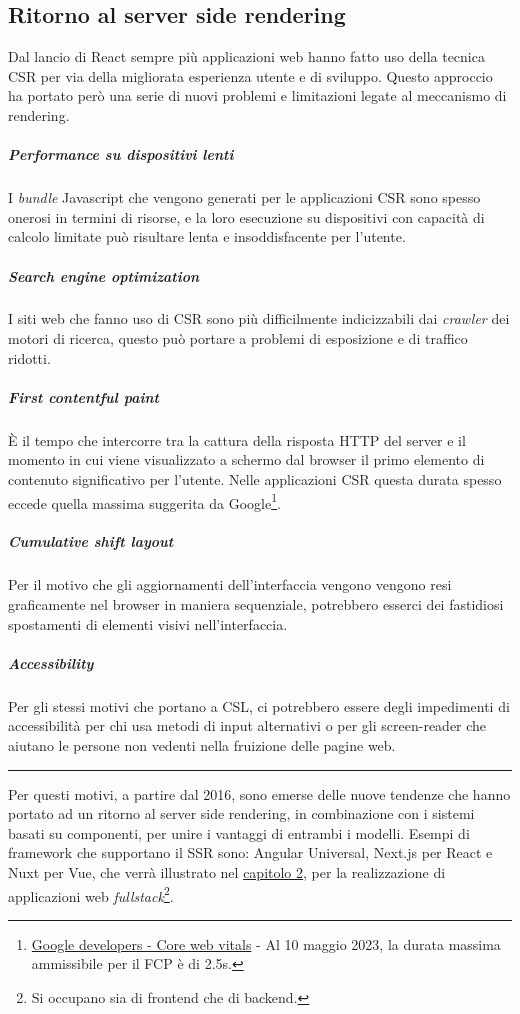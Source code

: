 \subsection{Ritorno al server side
rendering}\label{ritorno-al-server-side-rendering}

Dal lancio di React sempre più applicazioni web hanno fatto uso della
tecnica CSR per via della migliorata esperienza utente e di sviluppo.
Questo approccio ha portato però una serie di nuovi problemi e
limitazioni legate al meccanismo di rendering.

\subparagraph{Performance su dispositivi
lenti}\label{performance-su-dispositivi-lenti}

I \emph{bundle} Javascript che vengono generati per le applicazioni CSR
sono spesso onerosi in termini di risorse, e la loro esecuzione su
dispositivi con capacità di calcolo limitate può risultare lenta e
insoddisfacente per l'utente.

\subparagraph{Search engine
optimization}\label{search-engine-optimization}

I siti web che fanno uso di CSR sono più difficilmente indicizzabili dai
\emph{crawler} dei motori di ricerca, questo può portare a problemi di
esposizione e di traffico ridotti.

\subparagraph{First contentful paint}\label{first-contentful-paint}

È il tempo che intercorre tra la cattura della risposta HTTP del server
e il momento in cui viene visualizzato a schermo dal browser il primo
elemento di contenuto significativo per l'utente. Nelle applicazioni CSR
questa durata spesso eccede quella massima suggerita da
Google\footnote{\href{https://developers.google.com/search/docs/appearance/core-web-vitals?hl=it}{Google
  developers - Core web vitals} - Al 10 maggio 2023, la durata massima
  ammissibile per il FCP è di 2.5s.}.

\subparagraph{Cumulative shift layout}\label{cumulative-shift-layout}

Per il motivo che gli aggiornamenti dell'interfaccia vengono vengono
resi graficamente nel browser in maniera sequenziale, potrebbero esserci
dei fastidiosi spostamenti di elementi visivi nell'interfaccia.

\subparagraph{Accessibility}\label{accessibility}

Per gli stessi motivi che portano a CSL, ci potrebbero essere degli
impedimenti di accessibilità per chi usa metodi di input alternativi o
per gli screen-reader che aiutano le persone non vedenti nella fruizione
delle pagine web.

\begin{center}\rule{0.5\linewidth}{0.5pt}\end{center}

Per questi motivi, a partire dal 2016, sono emerse delle nuove tendenze
che hanno portato ad un ritorno al server side rendering, in
combinazione con i sistemi basati su componenti, per unire i vantaggi di
entrambi i modelli. Esempi di framework che supportano il SSR sono:
Angular Universal, Next.js per React e Nuxt per Vue, che verrà
illustrato nel \hyperref[descrizione-delle-tecnologie]{capitolo 2}, per
la realizzazione di applicazioni web \emph{fullstack}\footnote{Si
  occupano sia di frontend che di backend.}.

